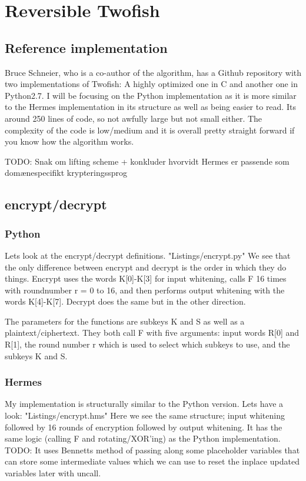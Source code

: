 \section{Reversible Twofish}
\subsection{Reference implementation}
Bruce Schneier, who is a co-author of the algorithm, has a Github repository \cite{Git2F} with two implementations of Twofish: A highly optimized one in C and another one in Python2.7.
I will be focusing on the Python implementation as it is more similar to the Hermes implementation in its structure as well as being easier to read.
Its around 250 lines of code, so not awfully large but not small either. The complexity of the code is low/medium and it is overall pretty straight forward if you know how the algorithm works.

TODO: Snak om lifting scheme + konkluder hvorvidt Hermes er passende som domænespecifikt krypteringssprog

\subsection{encrypt/decrypt}
\subsubsection{Python}
Lets look at the encrypt/decrypt definitions.
 {"Listings/encrypt.py"}
We see that the only difference between encrypt and decrypt is the order in which they do things.
Encrypt uses the words K[0]-K[3] for input whitening, calls F 16 times with roundnumber r = 0 to 16, and then performs output whitening with the words K[4]-K[7]. Decrypt does the same but in the other direction. 

The parameters for the functions are subkeys K and S as well as a plaintext/ciphertext.
They both call F with five arguments: input words R[0] and R[1], the round number r which is used to select which subkeys to use, and the subkeys K and S.

\subsubsection{Hermes}
My implementation is structurally similar to the Python version. Lets have a look:
 {"Listings/encrypt.hms"}
Here we see the same structure; input whitening followed by 16 rounds of encryption followed by output whitening. It has the same logic (calling F and rotating/XOR'ing) as the Python implementation. TODO: It uses Bennetts method of passing along some placeholder variables that can store some intermediate values which we can use to reset the inplace updated variables later with uncall.

